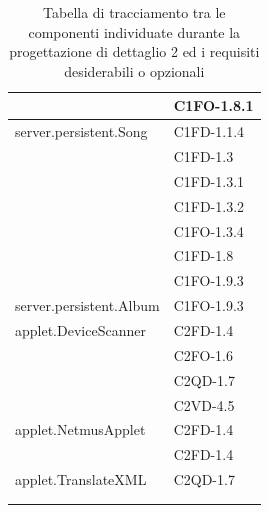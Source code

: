 \begin{footnotesize}
\begin{longtable}[!h]{|l|l|}
& C1FO-1.8.1\\\hline 
server.persistent.Song  &  C1FD-1.1.4 \\
& C1FD-1.3\\
& C1FD-1.3.1\\
& C1FD-1.3.2\\
& C1FO-1.3.4\\
& C1FD-1.8\\
& C1FO-1.9.3\\\hline 
server.persistent.Album  &  C1FO-1.9.3\\\hline 
applet.DeviceScanner  &  C2FD-1.4\\
& C2FO-1.6\\
& C2QD-1.7\\
& C2VD-4.5\\\hline
applet.NetmusApplet  &  C2FD-1.4 \\
& C2FD-1.4\\\hline
applet.TranslateXML  &  C2QD-1.7\\
& \\\hline
\caption{Tabella di tracciamento tra le componenti individuate durante la
progettazione di dettaglio 2 ed i requisiti desiderabili o opzionali}
\end{longtable}
\end{footnotesize}


